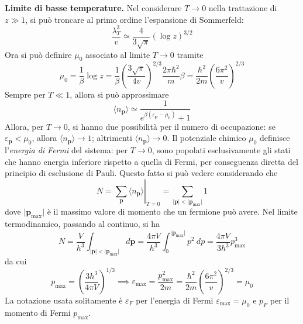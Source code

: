 \documentclass[11pt, a4paper]{scrartcl}
\theoremstyle{style}
\theoremstyle{style1}
\newcommand*\Eval[3]{\left.#1\right\rvert_{#2}^{#3}}
\numberwithin{equation}{subsection}
\begin{document}
\textbf{Limite di basse temperature.} Nel considerare $T\to 0$ nella trattazione di $z\gg 1$, si pu\`o troncare al primo ordine l'espansione di Sommerfeld:
\[
	\frac{\lambda _T^3}{v} \simeq \frac{4}{3\sqrt{\pi} } (\log z ) ^{3 / 2}
\] 
Ora si pu\`o definire $\mu _0$ associato al limite $T\to  0$ tramite
\[
\mu _0 = \frac{1}{\beta }\log z = \frac{1}{\beta } \left(\frac{3\sqrt{\pi} }{4v}\right) ^{2 / 3} \frac{2\pi \hbar ^2}{m}\beta  = \frac{\hbar ^2}{2m} \left(\frac{6 \pi ^2}{v}\right) ^{2 / 3}
\] 
Sempre per $T\ll 1$, allora si pu\`o approssimare
\[
\langle n_\mathbf{p}  \rangle \simeq \frac{1}{e^{\beta (\varepsilon _\mathbf{p} -\mu _0)}+1}
\] 
Allora, per $T\to 0$, si hanno due possibilit\`a per il numero di occupazione: se $\varepsilon _\mathbf{p} < \mu _0$, allora $\langle n_\mathbf{p}  \rangle\to 1$; altrimenti $\langle n_\mathbf{p}  \rangle\to 0$.
Il potenziale chimico $\mu _0$ definisce l'\textit{energia di Fermi} del sistema: per $T\to 0$, sono popolati esclusivamente gli stati che hanno energia inferiore rispetto a quella di Fermi, per conseguenza diretta del principio di esclusione di Pauli.
Questo fatto si pu\`o vedere considerando che
\[
	N = \Eval{\sum_{\mathbf{p} }^{}\langle n_\mathbf{p}  \rangle}{T=0}{} = \sum_{\lvert \mathbf{p}  \rvert < \lvert \mathbf{p} _\text{max} \rvert }^{}1
\] 
dove $\lvert \mathbf{p} _\text{max} \rvert $ \`e il massimo valore di momento che un fermione pu\`o avere. 
Nel limite termodinamico, passando al continuo, si ha
\[
N = \frac{V}{h^3}\int _{\lvert \mathbf{p}  \rvert <\lvert \mathbf{p} _\text{max} \rvert }  d\mathbf{p}  = \frac{4\pi V}{h^3} \int_0^{\lvert \mathbf{p} _\text{max} \rvert } p^2 \ dp = \frac{4\pi V}{3h^3}p_\text{max}^3
\] 
da cui 
\[
p_\text{max} = \left(\frac{3h^3}{4 \pi V}\right) ^{1 / 3} \implies \varepsilon _\text{max} = \frac{p_\text{max}^2}{2m}=\frac{\hbar ^2}{2m}\left(\frac{6\pi^2}{v}\right) ^{2 / 3}  = \mu _0
\] 
La notazione usata solitamente \`e $\varepsilon _F$ per l'energia di Fermi $\varepsilon _\text{max}= \mu _0$ e $p_F$ per il momento di Fermi $p_\text{max}$.

\vspace{.5cm}
\end{document}
